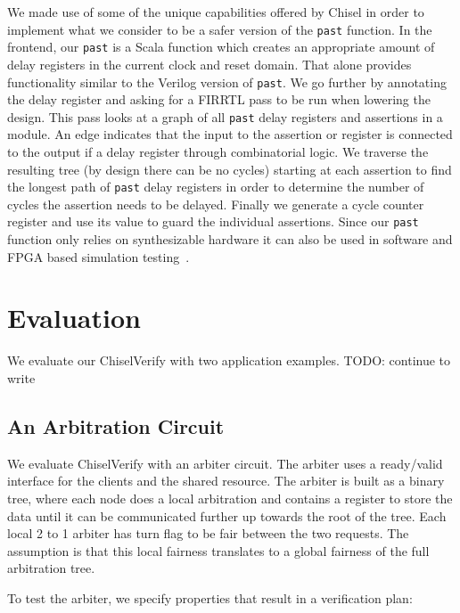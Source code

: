\documentclass[conference]{IEEEtran}
\newcommand{\code}[1]{{\small{\texttt{#1}}}}
\newcommand{\todo}[1]{{\color{olive} TODO: #1}}
\begin{document}
We made use of some of the unique capabilities offered by Chisel in order to implement what we consider to be a safer version of the
\code{past} function.
In the frontend, our \code{past} is a Scala function which creates an appropriate amount of delay registers in the current
clock and reset domain. That alone provides functionality similar to the Verilog version of \code{past}.
We go further by annotating the delay register and asking for a FIRRTL pass to be run when lowering the design.
This pass looks at a graph of all \code{past} delay registers and assertions in a module.
An edge indicates that the input to the assertion or register is connected to the output if a delay register through combinatorial logic.
We traverse the resulting tree (by design there can be no cycles) starting at each assertion
to find the longest path of \code{past} delay registers in order to determine the number of cycles the assertion needs to be delayed.
Finally we generate a cycle counter register and use its value to guard the individual assertions.
Since our \code{past} function only relies on synthesizable hardware it can also be used in software and FPGA based
simulation testing~\cite{karandikar2018firesim}.






\section{Evaluation}
\label{sec:eval}

We evaluate our ChiselVerify with two application examples. \todo{continue to write}

\subsection{An Arbitration Circuit}

We evaluate ChiselVerify with an arbiter circuit. The arbiter uses a ready/valid interface for the clients
and the shared resource. The arbiter is built as a binary tree, where each node does a local arbitration
and contains a register to store the data until it can be communicated further up towards the root of the
tree. Each local 2 to 1 arbiter has turn flag to be fair between the two requests. The assumption is that
this local fairness translates to a global fairness of the full arbitration tree.

To test the arbiter, we specify properties that result in a verification plan:
\end{document}
